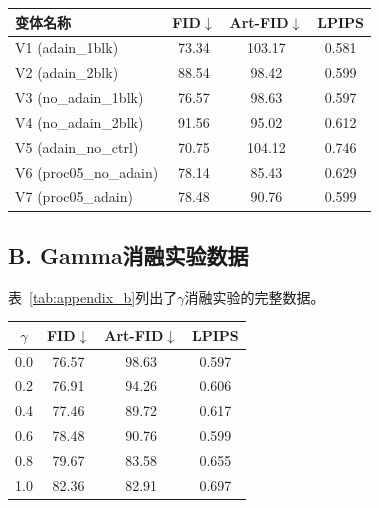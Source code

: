 \documentclass[10pt,twocolumn]{article}
\begin{document}
\begin{center}
  \centering
  \small
  \label{tab:appendix_a}
  \vspace{-2pt}
  \begin{tabular}{lccc}
    \toprule
    变体名称 & FID$\downarrow$ & Art-FID$\downarrow$ & LPIPS \\
    \midrule
    V1 (adain\_1blk)       & 73.34 & 103.17 & 0.581 \\
    V2 (adain\_2blk)       & 88.54 & 98.42  & 0.599 \\
    V3 (no\_adain\_1blk)   & 76.57 & 98.63  & 0.597 \\
    V4 (no\_adain\_2blk)   & 91.56 & 95.02  & 0.612 \\
    V5 (adain\_no\_ctrl)   & 70.75 & 104.12 & 0.746 \\
    V6 (proc05\_no\_adain) & 78.14 & 85.43  & 0.629 \\
    V7 (proc05\_adain)     & 78.48 & 90.76  & 0.599 \\
    \bottomrule
  \end{tabular}
\end{center}

\subsection*{B. Gamma消融实验数据}

表~\ref{tab:appendix_b}列出了$\gamma$消融实验的完整数据。

\begin{center}
  \centering
  \small
  \label{tab:appendix_b}
  \vspace{-2pt}
  \begin{tabular}{cccc}
    \toprule
    $\gamma$ & FID$\downarrow$ & Art-FID$\downarrow$ & LPIPS \\
    \midrule
    0.0 & 76.57 & 98.63 & 0.597 \\
    0.2 & 76.91 & 94.26 & 0.606 \\
    0.4 & 77.46 & 89.72 & 0.617 \\
    0.6 & 78.48 & 90.76 & 0.599 \\
    0.8 & 79.67 & 83.58 & 0.655 \\
    1.0 & 82.36 & 82.91 & 0.697 \\
    \bottomrule
  \end{tabular}
\end{center}

\endgroup
\end{document}
